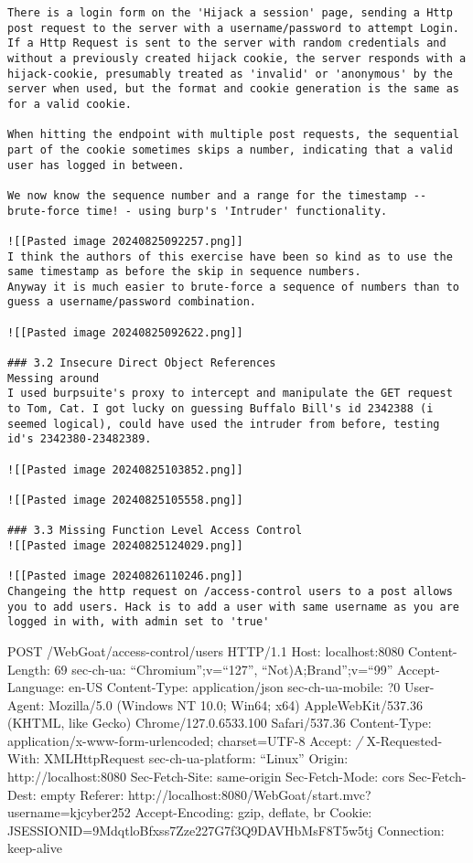 \begin{verbatim}
There is a login form on the 'Hijack a session' page, sending a Http post request to the server with a username/password to attempt Login. If a Http Request is sent to the server with random credentials and without a previously created hijack cookie, the server responds with a hijack-cookie, presumably treated as 'invalid' or 'anonymous' by the server when used, but the format and cookie generation is the same as for a valid cookie.

When hitting the endpoint with multiple post requests, the sequential part of the cookie sometimes skips a number, indicating that a valid user has logged in between.

We now know the sequence number and a range for the timestamp -- brute-force time! - using burp's 'Intruder' functionality. 

![[Pasted image 20240825092257.png]]
I think the authors of this exercise have been so kind as to use the same timestamp as before the skip in sequence numbers. 
Anyway it is much easier to brute-force a sequence of numbers than to guess a username/password combination.

![[Pasted image 20240825092622.png]]

### 3.2 Insecure Direct Object References
Messing around
I used burpsuite's proxy to intercept and manipulate the GET request to Tom, Cat. I got lucky on guessing Buffalo Bill's id 2342388 (i seemed logical), could have used the intruder from before, testing id's 2342380-23482389.   

![[Pasted image 20240825103852.png]]

![[Pasted image 20240825105558.png]]

### 3.3 Missing Function Level Access Control
![[Pasted image 20240825124029.png]]

![[Pasted image 20240826110246.png]]
Changeing the http request on /access-control users to a post allows you to add users. Hack is to add a user with same username as you are logged in with, with admin set to 'true'
\end{verbatim}

POST /WebGoat/access-control/users HTTP/1.1 Host: localhost:8080
Content-Length: 69 sec-ch-ua: ``Chromium'';v=``127'',
``Not)A;Brand'';v=``99'' Accept-Language: en-US Content-Type:
application/json sec-ch-ua-mobile: ?0 User-Agent: Mozilla/5.0 (Windows
NT 10.0; Win64; x64) AppleWebKit/537.36 (KHTML, like Gecko)
Chrome/127.0.6533.100 Safari/537.36 Content-Type:
application/x-www-form-urlencoded; charset=UTF-8 Accept: \emph{/}
X-Requested-With: XMLHttpRequest sec-ch-ua-platform: ``Linux'' Origin:
http://localhost:8080 Sec-Fetch-Site: same-origin Sec-Fetch-Mode: cors
Sec-Fetch-Dest: empty Referer:
http://localhost:8080/WebGoat/start.mvc?username=kjcyber252
Accept-Encoding: gzip, deflate, br Cookie:
JSESSIONID=9MdqtloBfxss7Zze227G7f3Q9DAVHbMsF8T5w5tj Connection:
keep-alive

